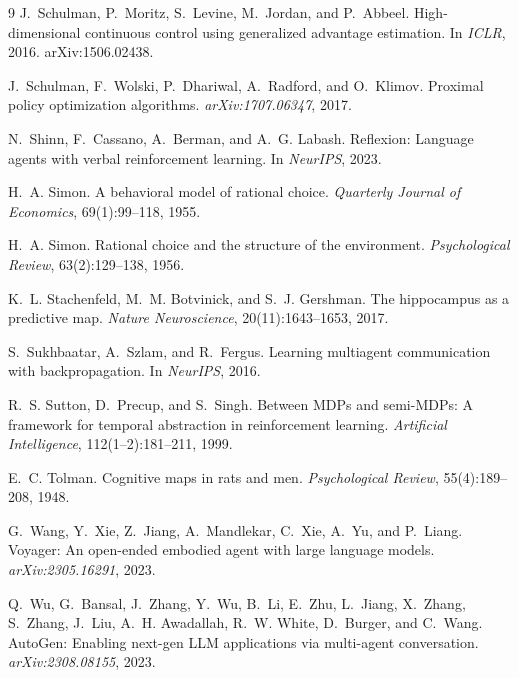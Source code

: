 \documentclass{article}
\begin{document}
{\begin{thebibliography}{9}
J.~Schulman, P.~Moritz, S.~Levine, M.~Jordan, and P.~Abbeel.
\newblock High-dimensional continuous control using generalized advantage estimation.
\newblock In \emph{ICLR}, 2016.
\newblock arXiv:1506.02438.

J.~Schulman, F.~Wolski, P.~Dhariwal, A.~Radford, and O.~Klimov.
\newblock Proximal policy optimization algorithms.
\newblock \emph{arXiv:1707.06347}, 2017.

N.~Shinn, F.~Cassano, A.~Berman, and A.~G. Labash.
\newblock Reflexion: Language agents with verbal reinforcement learning.
\newblock In \emph{NeurIPS}, 2023.

H.~A. Simon.
\newblock A behavioral model of rational choice.
\newblock \emph{Quarterly Journal of Economics}, 69(1):99--118, 1955.

H.~A. Simon.
\newblock Rational choice and the structure of the environment.
\newblock \emph{Psychological Review}, 63(2):129--138, 1956.

K.~L. Stachenfeld, M.~M. Botvinick, and S.~J. Gershman.
\newblock The hippocampus as a predictive map.
\newblock \emph{Nature Neuroscience}, 20(11):1643--1653, 2017.

S.~Sukhbaatar, A.~Szlam, and R.~Fergus.
\newblock Learning multiagent communication with backpropagation.
\newblock In \emph{NeurIPS}, 2016.

R.~S. Sutton, D.~Precup, and S.~Singh.
\newblock Between MDPs and semi-MDPs: A framework for temporal abstraction in reinforcement learning.
\newblock \emph{Artificial Intelligence}, 112(1--2):181--211, 1999.

E.~C. Tolman.
\newblock Cognitive maps in rats and men.
\newblock \emph{Psychological Review}, 55(4):189--208, 1948.

G.~Wang, Y.~Xie, Z.~Jiang, A.~Mandlekar, C.~Xie, A.~Yu, and P.~Liang.
\newblock Voyager: An open-ended embodied agent with large language models.
\newblock \emph{arXiv:2305.16291}, 2023.

Q.~Wu, G.~Bansal, J.~Zhang, Y.~Wu, B.~Li, E.~Zhu, L.~Jiang, X.~Zhang, S.~Zhang, J.~Liu, A.~H. Awadallah, R.~W. White, D.~Burger, and C.~Wang.
\newblock AutoGen: Enabling next-gen LLM applications via multi-agent conversation.
\newblock \emph{arXiv:2308.08155}, 2023.


\end{thebibliography}}
\end{document}
